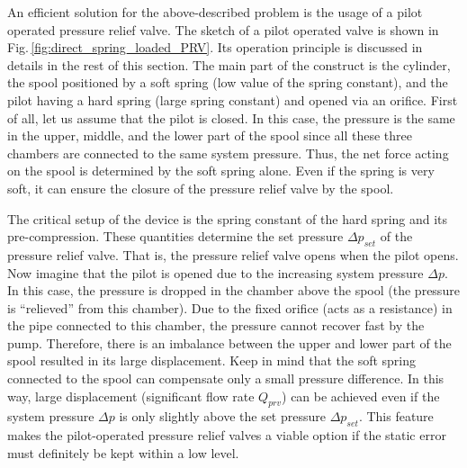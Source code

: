 An efficient solution for the above-described problem is the usage of a pilot operated pressure relief valve. The sketch of a pilot operated valve is shown in Fig.\,\ref{fig:direct_spring_loaded_PRV}. Its operation principle is discussed in details in the rest of this section. The main part of the construct is the cylinder, the spool positioned by a soft spring (low value of the spring constant), and the pilot having a hard spring (large spring constant) and opened via an orifice. First of all, let us assume that the pilot is closed. In this case, the pressure is the same in the upper, middle, and the lower part of the spool since all these three chambers are connected to the same system pressure. Thus, the net force acting on the spool is determined by the soft spring alone. Even if the spring is very soft, it can ensure the closure of the pressure relief valve by the spool.

The critical setup of the device is the spring constant of the hard spring and its pre-compression. These quantities determine the set pressure $\Delta p_{set}$ of the pressure relief valve. That is, the pressure relief valve opens when the pilot opens. Now imagine that the pilot is opened due to the increasing system pressure $\Delta p$. In this case, the pressure is dropped in the chamber above the spool (the pressure is ``relieved'' from this chamber). Due to the fixed orifice (acts as a resistance) in the pipe connected to this chamber, the pressure cannot recover fast by the pump. Therefore, there is an imbalance between the upper and lower part of the spool resulted in its large displacement. Keep in mind that the soft spring connected to the spool can compensate only a small pressure difference. In this way, large displacement (significant flow rate $Q_{prv}$) can be achieved even if the system pressure $\Delta p$ is only slightly above the set pressure $\Delta p_{set}$. This feature makes the pilot-operated pressure relief valves a viable option if the static error must definitely be kept within a low level.

